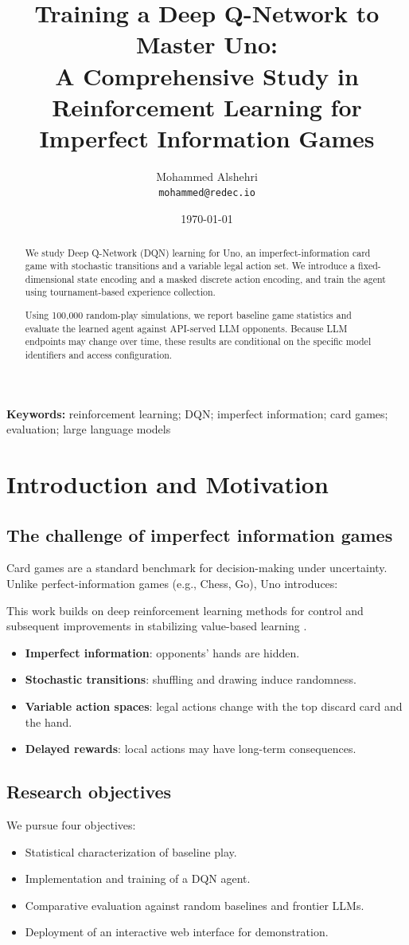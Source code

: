 \documentclass[11pt]{article}
\title{Training a Deep Q-Network to Master Uno: \\ A Comprehensive Study in Reinforcement Learning for Imperfect Information Games}
\author{Mohammed Alshehri \\ \texttt{mohammed@redec.io}}
\date{\today}
\begin{document}
\maketitle

\begin{abstract}
We study Deep Q-Network (DQN) learning for Uno, an imperfect-information card game with stochastic transitions and a variable legal action set. We introduce a fixed-dimensional state encoding and a masked discrete action encoding, and train the agent using tournament-based experience collection.

Using 100{,}000 random-play simulations, we report baseline game statistics and evaluate the learned agent against API-served LLM opponents. Because LLM endpoints may change over time, these results are conditional on the specific model identifiers and access configuration.
\end{abstract}

\textbf{Keywords:} reinforcement learning; DQN; imperfect information; card games; evaluation; large language models

\section{Introduction and Motivation}
\subsection{The challenge of imperfect information games}
Card games are a standard benchmark for decision-making under uncertainty. Unlike perfect-information games (e.g., Chess, Go), Uno introduces:

This work builds on deep reinforcement learning methods for control \parencite{mnih2015human} and subsequent improvements in stabilizing value-based learning \parencite{vanhasselt2016double}.
\begin{itemize}
  \item \textbf{Imperfect information}: opponents' hands are hidden.
  \item \textbf{Stochastic transitions}: shuffling and drawing induce randomness.
  \item \textbf{Variable action spaces}: legal actions change with the top discard card and the hand.
  \item \textbf{Delayed rewards}: local actions may have long-term consequences.
\end{itemize}

\subsection{Research objectives}
We pursue four objectives:
\begin{itemize}
  \item Statistical characterization of baseline play.
  \item Implementation and training of a DQN agent.
  \item Comparative evaluation against random baselines and frontier LLMs.
  \item Deployment of an interactive web interface for demonstration.
\end{itemize}
\end{document}
